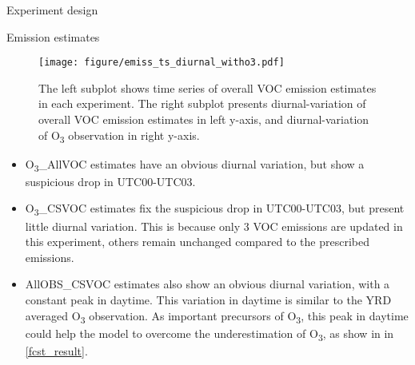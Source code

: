 \documentclass[final]{beamer}
\newlength{\colwidth}
\begin{document}
\begin{frame}[t]
\begin{columns}[t]
\begin{column}{\colwidth}
\begin{block}{Experiment design}
			\end{block}

			\begin{alertblock}{Emission estimates}
                \begin{figure}
                \begin{minipage}[c]{0.8\textwidth}
                    \texttt{[image: figure/emiss\_ts\_diurnal\_witho3.pdf]}
                \end{minipage}
                \hfill
                 \begin{minipage}[c]{0.18\textwidth}
                    \RaggedRight
                    \caption{The left subplot shows time series of overall VOC emission estimates in each experiment. The right subplot presents diurnal-variation of overall VOC emission estimates in left y-axis, and diurnal-variation of O\textsubscript{3} observation  in right y-axis.}\label{fig_emiss_ts}                     
                 \end{minipage}   

                    
                \end{figure}
                
                \begin{itemize}
                    \item O\textsubscript{3}\_AllVOC estimates have an obvious diurnal variation, but show a suspicious drop in UTC00-UTC03.
                    \item O\textsubscript{3}\_CSVOC estimates fix the suspicious drop in UTC00-UTC03, but present little diurnal variation. This is because only 3 VOC emissions are updated in this experiment, others remain unchanged compared to the prescribed emissions.
                    \item AllOBS\_CSVOC estimates also show an obvious diurnal variation, with a constant peak in daytime. This variation in daytime is similar to the YRD averaged O\textsubscript{3} observation. As important precursors of O\textsubscript{3}, this peak in daytime could help the model to overcome the underestimation  of O\textsubscript{3}, as show in in \cref{fcst_result}.
                \end{itemize}

			\end{alertblock}


\end{column}
\end{columns}
\end{frame}
\end{document}
